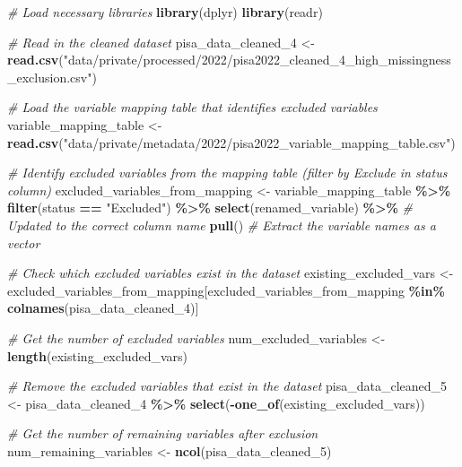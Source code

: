 \documentclass[
]{article}
\newenvironment{Shaded}{\begin{snugshade}}{\end{snugshade}}
\newcommand{\CommentTok}[1]{\textcolor[rgb]{0.56,0.35,0.01}{\textit{#1}}}
\newcommand{\FunctionTok}[1]{\textcolor[rgb]{0.13,0.29,0.53}{\textbf{#1}}}
\newcommand{\NormalTok}[1]{#1}
\newcommand{\OtherTok}[1]{\textcolor[rgb]{0.56,0.35,0.01}{#1}}
\newcommand{\SpecialCharTok}[1]{\textcolor[rgb]{0.81,0.36,0.00}{\textbf{#1}}}
\newcommand{\StringTok}[1]{\textcolor[rgb]{0.31,0.60,0.02}{#1}}
\begin{document}
\begin{Shaded}
\begin{Highlighting}[]
\CommentTok{\# Load necessary libraries}
\FunctionTok{library}\NormalTok{(dplyr)}
\FunctionTok{library}\NormalTok{(readr)}

\CommentTok{\# Read in the cleaned dataset}
\NormalTok{pisa\_data\_cleaned\_4 }\OtherTok{\textless{}{-}} \FunctionTok{read.csv}\NormalTok{(}\StringTok{"data/private/processed/2022/pisa2022\_cleaned\_4\_high\_missingness\_exclusion.csv"}\NormalTok{)}

\CommentTok{\# Load the variable mapping table that identifies excluded variables}
\NormalTok{variable\_mapping\_table }\OtherTok{\textless{}{-}} \FunctionTok{read.csv}\NormalTok{(}\StringTok{"data/private/metadata/2022/pisa2022\_variable\_mapping\_table.csv"}\NormalTok{)}

\CommentTok{\# Identify excluded variables from the mapping table (filter by \textquotesingle{}Exclude\textquotesingle{} in \textquotesingle{}status\textquotesingle{} column)}
\NormalTok{excluded\_variables\_from\_mapping }\OtherTok{\textless{}{-}}\NormalTok{ variable\_mapping\_table }\SpecialCharTok{\%\textgreater{}\%}
  \FunctionTok{filter}\NormalTok{(status }\SpecialCharTok{==} \StringTok{"Excluded"}\NormalTok{) }\SpecialCharTok{\%\textgreater{}\%}
  \FunctionTok{select}\NormalTok{(renamed\_variable) }\SpecialCharTok{\%\textgreater{}\%}  \CommentTok{\# Updated to the correct column name}
  \FunctionTok{pull}\NormalTok{()  }\CommentTok{\# Extract the variable names as a vector}

\CommentTok{\# Check which excluded variables exist in the dataset}
\NormalTok{existing\_excluded\_vars }\OtherTok{\textless{}{-}}\NormalTok{ excluded\_variables\_from\_mapping[excluded\_variables\_from\_mapping }\SpecialCharTok{\%in\%} \FunctionTok{colnames}\NormalTok{(pisa\_data\_cleaned\_4)]}

\CommentTok{\# Get the number of excluded variables}
\NormalTok{num\_excluded\_variables }\OtherTok{\textless{}{-}} \FunctionTok{length}\NormalTok{(existing\_excluded\_vars)}

\CommentTok{\# Remove the excluded variables that exist in the dataset}
\NormalTok{pisa\_data\_cleaned\_5 }\OtherTok{\textless{}{-}}\NormalTok{ pisa\_data\_cleaned\_4 }\SpecialCharTok{\%\textgreater{}\%}
  \FunctionTok{select}\NormalTok{(}\SpecialCharTok{{-}}\FunctionTok{one\_of}\NormalTok{(existing\_excluded\_vars))}

\CommentTok{\# Get the number of remaining variables after exclusion}
\NormalTok{num\_remaining\_variables }\OtherTok{\textless{}{-}} \FunctionTok{ncol}\NormalTok{(pisa\_data\_cleaned\_5)}


\end{Highlighting}
\end{Shaded}
\end{document}
